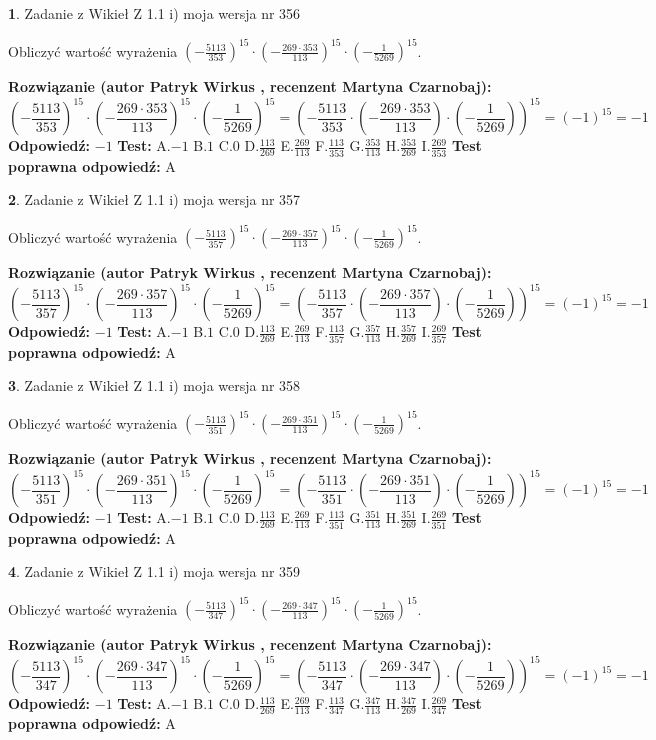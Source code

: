 \documentclass[12pt, a4paper]{article}
\theoremstyle{definition} %
\newtheorem{zad}{}
\newcommand{\zadStart}[1]{\begin{zad}#1\newline}
\newcommand{\zadStop}{\end{zad}}
\newcommand{\rozwStart}[2]{\noindent \textbf{Rozwiązanie (autor #1 , recenzent #2): }\newline}
\newcommand{\rozwStop}{\newline}
\newcommand{\odpStart}{\noindent \textbf{Odpowiedź:}\newline}
\newcommand{\odpStop}{\newline}
\newcommand{\testStart}{\noindent \textbf{Test:}\newline}
\newcommand{\testStop}{\newline}
\newcommand{\kluczStart}{\noindent \textbf{Test poprawna odpowiedź:}\newline}
\newcommand{\kluczStop}{\newline}
\begin{document}
\zadStart{Zadanie z Wikieł Z 1.1 i) moja wersja nr 356}

Obliczyć wartość wyrażenia $(-\frac{5113}{353})^{15} \cdot (-\frac{269 \cdot 353}{113})^{15} \cdot (-\frac{1}{5269})^{15}$.
\zadStop
\rozwStart{Patryk Wirkus}{Martyna Czarnobaj}
$$(-\frac{5113}{353})^{15} \cdot (-\frac{269 \cdot 353}{113})^{15} \cdot (-\frac{1}{5269})^{15} = (-\frac{5113}{353} \cdot (-\frac{269 \cdot 353}{113}) \cdot (-\frac{1}{5269}))^{15} = (-1)^{15} = -1$$
\rozwStop
\odpStart
$-1$
\odpStop
\testStart
A.$-1$ B.$1$ C.$0$ D.$\frac{113}{269}$ E.$\frac{269}{113}$
F.$\frac{113}{353}$ G.$\frac{353}{113}$
H.$\frac{353}{269}$
I.$\frac{269}{353}$
\testStop
\kluczStart
A
\kluczStop



\zadStart{Zadanie z Wikieł Z 1.1 i) moja wersja nr 357}

Obliczyć wartość wyrażenia $(-\frac{5113}{357})^{15} \cdot (-\frac{269 \cdot 357}{113})^{15} \cdot (-\frac{1}{5269})^{15}$.
\zadStop
\rozwStart{Patryk Wirkus}{Martyna Czarnobaj}
$$(-\frac{5113}{357})^{15} \cdot (-\frac{269 \cdot 357}{113})^{15} \cdot (-\frac{1}{5269})^{15} = (-\frac{5113}{357} \cdot (-\frac{269 \cdot 357}{113}) \cdot (-\frac{1}{5269}))^{15} = (-1)^{15} = -1$$
\rozwStop
\odpStart
$-1$
\odpStop
\testStart
A.$-1$ B.$1$ C.$0$ D.$\frac{113}{269}$ E.$\frac{269}{113}$
F.$\frac{113}{357}$ G.$\frac{357}{113}$
H.$\frac{357}{269}$
I.$\frac{269}{357}$
\testStop
\kluczStart
A
\kluczStop



\zadStart{Zadanie z Wikieł Z 1.1 i) moja wersja nr 358}

Obliczyć wartość wyrażenia $(-\frac{5113}{351})^{15} \cdot (-\frac{269 \cdot 351}{113})^{15} \cdot (-\frac{1}{5269})^{15}$.
\zadStop
\rozwStart{Patryk Wirkus}{Martyna Czarnobaj}
$$(-\frac{5113}{351})^{15} \cdot (-\frac{269 \cdot 351}{113})^{15} \cdot (-\frac{1}{5269})^{15} = (-\frac{5113}{351} \cdot (-\frac{269 \cdot 351}{113}) \cdot (-\frac{1}{5269}))^{15} = (-1)^{15} = -1$$
\rozwStop
\odpStart
$-1$
\odpStop
\testStart
A.$-1$ B.$1$ C.$0$ D.$\frac{113}{269}$ E.$\frac{269}{113}$
F.$\frac{113}{351}$ G.$\frac{351}{113}$
H.$\frac{351}{269}$
I.$\frac{269}{351}$
\testStop
\kluczStart
A
\kluczStop



\zadStart{Zadanie z Wikieł Z 1.1 i) moja wersja nr 359}

Obliczyć wartość wyrażenia $(-\frac{5113}{347})^{15} \cdot (-\frac{269 \cdot 347}{113})^{15} \cdot (-\frac{1}{5269})^{15}$.
\zadStop
\rozwStart{Patryk Wirkus}{Martyna Czarnobaj}
$$(-\frac{5113}{347})^{15} \cdot (-\frac{269 \cdot 347}{113})^{15} \cdot (-\frac{1}{5269})^{15} = (-\frac{5113}{347} \cdot (-\frac{269 \cdot 347}{113}) \cdot (-\frac{1}{5269}))^{15} = (-1)^{15} = -1$$
\rozwStop
\odpStart
$-1$
\odpStop
\testStart
A.$-1$ B.$1$ C.$0$ D.$\frac{113}{269}$ E.$\frac{269}{113}$
F.$\frac{113}{347}$ G.$\frac{347}{113}$
H.$\frac{347}{269}$
I.$\frac{269}{347}$
\testStop
\kluczStart
A
\kluczStop
\end{document}

